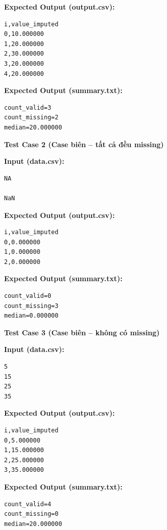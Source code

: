\textbf{Expected Output (output.csv):}
\begin{lstlisting}
i,value_imputed
0,10.000000
1,20.000000
2,30.000000
3,20.000000
4,20.000000
\end{lstlisting}

\textbf{Expected Output (summary.txt):}
\begin{lstlisting}
count_valid=3
count_missing=2
median=20.000000
\end{lstlisting}

\vspace{0.5cm}

\textbf{Test Case 2 (Case biên -- tất cả đều missing)}

\textbf{Input (data.csv):}
\begin{lstlisting}
NA

NaN
\end{lstlisting}

\textbf{Expected Output (output.csv):}
\begin{lstlisting}
i,value_imputed
0,0.000000
1,0.000000
2,0.000000
\end{lstlisting}

\textbf{Expected Output (summary.txt):}
\begin{lstlisting}
count_valid=0
count_missing=3
median=0.000000
\end{lstlisting}

\vspace{0.5cm}

\textbf{Test Case 3 (Case biên -- không có missing)}

\textbf{Input (data.csv):}
\begin{lstlisting}
5
15
25
35
\end{lstlisting}

\textbf{Expected Output (output.csv):}
\begin{lstlisting}
i,value_imputed
0,5.000000
1,15.000000
2,25.000000
3,35.000000
\end{lstlisting}

\textbf{Expected Output (summary.txt):}
\begin{lstlisting}
count_valid=4
count_missing=0
median=20.000000
\end{lstlisting}